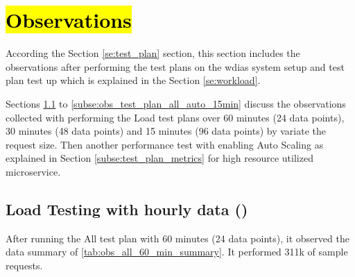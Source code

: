 \section{\hl{Observations}}

According the Section \ref{se:test_plan} section, this section includes the observations after performing the test plans on the \acrshort{wdias} system setup and test plan test up which is explained in the Section \ref{se:workload}.

Sections \ref{subse:obs_test_plan_all_60min} to \ref{subse:obs_test_plan_all_auto_15min} discuss the observations collected with performing the Load test plans over 60 minutes (24 data points), 30 minutes (48 data points) and 15 minutes (96 data points) by variate the request size. Then another performance test with enabling Auto Scaling as explained in Section \ref{subse:test_plan_metrics} for high resource utilized microservice.

\subsection{Load Testing with hourly data ()}
\label{subse:obs_test_plan_all_60min}

After running the All test plan with 60 minutes (24 data points), it observed the data summary of \ref{tab:obs_all_60_min_summary}. It performed 311k of sample requests.

